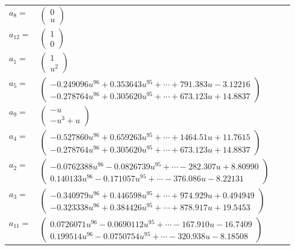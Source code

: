 \documentclass[1p]{elsarticle_modified}
\theoremstyle{definition}
\begin{document}
\begin{tabular}{m{7pt} m{180pt} m{7pt} m{180pt} }
\flushright $a_{8}=$&$\begin{pmatrix}0\\u\end{pmatrix}$ \\
\flushright $a_{12}=$&$\begin{pmatrix}1\\0\end{pmatrix}$ \\
\flushright $a_{1}=$&$\begin{pmatrix}1\\u^2\end{pmatrix}$ \\
\flushright $a_{5}=$&$\begin{pmatrix}-0.249096 u^{96}+0.353643 u^{95}+\cdots+791.383 u-3.12216\\-0.278764 u^{96}+0.305620 u^{95}+\cdots+673.123 u+14.8837\end{pmatrix}$ \\
\flushright $a_{9}=$&$\begin{pmatrix}- u\\- u^3+u\end{pmatrix}$ \\
\flushright $a_{4}=$&$\begin{pmatrix}-0.527860 u^{96}+0.659263 u^{95}+\cdots+1464.51 u+11.7615\\-0.278764 u^{96}+0.305620 u^{95}+\cdots+673.123 u+14.8837\end{pmatrix}$ \\
\flushright $a_{2}=$&$\begin{pmatrix}-0.0762388 u^{96}-0.0826739 u^{95}+\cdots-282.307 u+8.80990\\0.140133 u^{96}-0.171057 u^{95}+\cdots-376.086 u-8.22131\end{pmatrix}$ \\
\flushright $a_{3}=$&$\begin{pmatrix}-0.340979 u^{96}+0.446598 u^{95}+\cdots+974.929 u+0.494949\\-0.323338 u^{96}+0.384426 u^{95}+\cdots+878.917 u+19.5453\end{pmatrix}$ \\
\flushright $a_{11}=$&$\begin{pmatrix}0.0726071 u^{96}-0.0690112 u^{95}+\cdots-167.910 u-16.7409\\0.199514 u^{96}-0.0750754 u^{95}+\cdots-320.938 u-8.18508\end{pmatrix}$ \\

\end{tabular}
\end{document}
